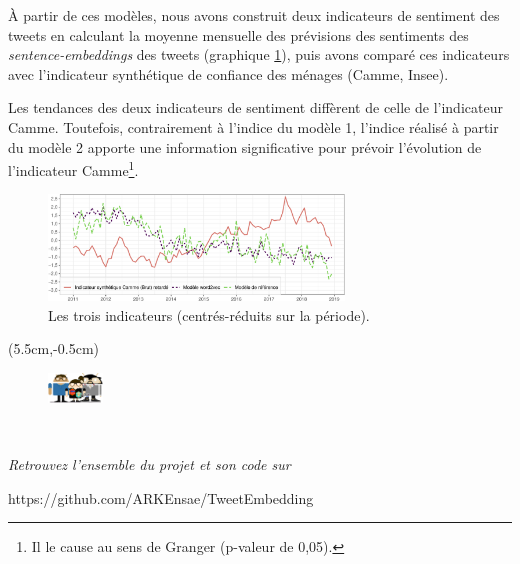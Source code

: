 \documentclass[10pt,french,french]{article}
\let\rmarkdownfootnote\footnote%
\def\footnote{\protect\rmarkdownfootnote}
\begin{document}
À partir de ces modèles, nous avons construit deux indicateurs de sentiment des tweets en calculant la moyenne mensuelle des prévisions des sentiments des \emph{sentence-embeddings} des tweets (graphique \ref{fig:bslogcam}), puis avons comparé ces indicateurs avec l'indicateur synthétique de confiance des ménages (Camme, Insee).

Les tendances des deux indicateurs de sentiment diffèrent de celle de l'indicateur Camme.
Toutefois, contrairement à l'indice du modèle 1, l'indice réalisé à partir du modèle 2 apporte une information significative pour prévoir l'évolution de l'indicateur Camme\footnote{Il le cause au sens de Granger (p-valeur de 0,05).}.

\begin{figure}[!htp]
\begin{center}
\includegraphics[width =0.7\textwidth]{img/rmd-graphSentiments-1}
\captionsetup{margin=0cm,format=hang,justification=justified}
\caption{Les trois indicateurs (centrés-réduits sur la période).}\label{fig:bslogcam}
\end{center}
\end{figure}

\begin{textblock*}{\textwidth}(5.5cm,-0.5cm)
\begin{center}
\begin{minipage}{0.7\textwidth}

\begin{figure}
\includegraphics[height=0.8cm]{img/avatars.png}
\end{figure}

$\phantom{saut}$

\emph{Retrouvez l'ensemble du projet et son code sur}

https://github.com/ARKEnsae/TweetEmbedding

\end{minipage}
\end{center}

\end{textblock*}
\end{document}
